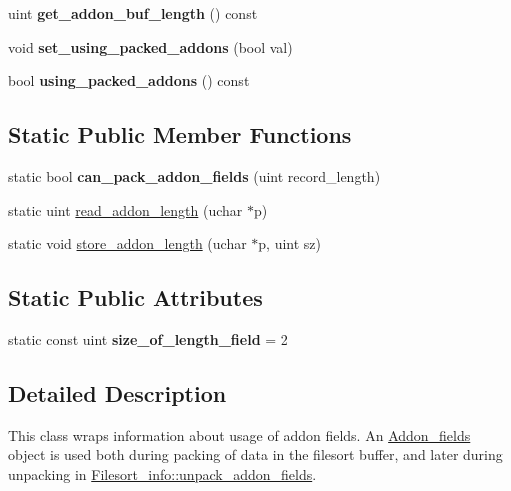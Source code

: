 \begin{DoxyCompactItemize}
\item 
\mbox{\label{classAddon__fields_ae5c0583185a8449d9b745bbada733842}} 
uint {\bfseries get\+\_\+addon\+\_\+buf\+\_\+length} () const
\item 
\mbox{\label{classAddon__fields_aa98acd8f2f9885d4c138991598ed8784}} 
void {\bfseries set\+\_\+using\+\_\+packed\+\_\+addons} (bool val)
\item 
\mbox{\label{classAddon__fields_ad63b16e79dfdb2ffea01d51c2de41ae1}} 
bool {\bfseries using\+\_\+packed\+\_\+addons} () const
\end{DoxyCompactItemize}
\subsection*{Static Public Member Functions}
\begin{DoxyCompactItemize}
\item 
\mbox{\label{classAddon__fields_aab331eaba2a26219024f17de695b2f06}} 
static bool {\bfseries can\+\_\+pack\+\_\+addon\+\_\+fields} (uint record\+\_\+length)
\item 
static uint \mbox{\hyperlink{classAddon__fields_a0cd4ab5178755aec49e999f78127864b}{read\+\_\+addon\+\_\+length}} (uchar $\ast$p)
\item 
static void \mbox{\hyperlink{classAddon__fields_a0d834a609fc85decc8d6ee3eaafbf109}{store\+\_\+addon\+\_\+length}} (uchar $\ast$p, uint sz)
\end{DoxyCompactItemize}
\subsection*{Static Public Attributes}
\begin{DoxyCompactItemize}
\item 
\mbox{\label{classAddon__fields_a546be09b1f8945b97deeca339cf601e4}} 
static const uint {\bfseries size\+\_\+of\+\_\+length\+\_\+field} = 2
\end{DoxyCompactItemize}


\subsection{Detailed Description}
This class wraps information about usage of addon fields. An \mbox{\hyperlink{classAddon__fields}{Addon\+\_\+fields}} object is used both during packing of data in the filesort buffer, and later during unpacking in \textquotesingle{}\mbox{\hyperlink{classFilesort__info_a972ae7583ff223e13df5b6d6cf4d0de8}{Filesort\+\_\+info\+::unpack\+\_\+addon\+\_\+fields}}\textquotesingle{}.

